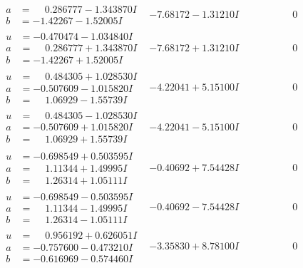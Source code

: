 \documentclass[1p]{elsarticle_modified}
\theoremstyle{definition}
\begin{document}
$$\begin{array}{c|c|c}
\begin{aligned}
a &= \phantom{-}0.286777 - 1.343870 I \\
b &= -1.42267 - 1.52005 I\end{aligned}
 & -7.68172 - 1.31210 I & \phantom{-0.000000 } 0 \\ \hline\begin{aligned}
u &= -0.470474 - 1.034840 I \\
a &= \phantom{-}0.286777 + 1.343870 I \\
b &= -1.42267 + 1.52005 I\end{aligned}
 & -7.68172 + 1.31210 I & \phantom{-0.000000 } 0 \\ \hline\begin{aligned}
u &= \phantom{-}0.484305 + 1.028530 I \\
a &= -0.507609 - 1.015820 I \\
b &= \phantom{-}1.06929 - 1.55739 I\end{aligned}
 & -4.22041 + 5.15100 I & \phantom{-0.000000 } 0 \\ \hline\begin{aligned}
u &= \phantom{-}0.484305 - 1.028530 I \\
a &= -0.507609 + 1.015820 I \\
b &= \phantom{-}1.06929 + 1.55739 I\end{aligned}
 & -4.22041 - 5.15100 I & \phantom{-0.000000 } 0 \\ \hline\begin{aligned}
u &= -0.698549 + 0.503595 I \\
a &= \phantom{-}1.11344 + 1.49995 I \\
b &= \phantom{-}1.26314 + 1.05111 I\end{aligned}
 & -0.40692 + 7.54428 I & \phantom{-0.000000 } 0 \\ \hline\begin{aligned}
u &= -0.698549 - 0.503595 I \\
a &= \phantom{-}1.11344 - 1.49995 I \\
b &= \phantom{-}1.26314 - 1.05111 I\end{aligned}
 & -0.40692 - 7.54428 I & \phantom{-0.000000 } 0 \\ \hline\begin{aligned}
u &= \phantom{-}0.956192 + 0.626051 I \\
a &= -0.757600 - 0.473210 I \\
b &= -0.616969 - 0.574460 I\end{aligned}
 & -3.35830 + 8.78100 I & \phantom{-0.000000 } 0 \\ \hline\begin{aligned}

\end{aligned}
\end{array}$$
\end{document}
